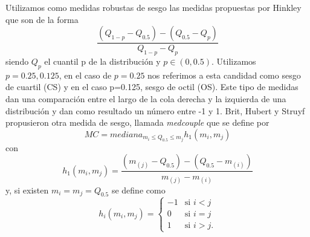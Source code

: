 \documentclass[letterpaper,12pt]{book}
\begin{document}
Utilizamos como medidas robustas de sesgo las medidas propuestas por Hinkley  que son de la forma
  \begin{equation}
    \frac{(Q_{1-p}-Q_{0.5})-(Q_{0.5}-Q_p)}{Q_{1-p}-Q_{p}}
  \end{equation}
siendo $Q_p$ el cuantil p de la distribución y $p\in(0,0.5)$. Utilizamos $p = 0.25, 0.125$, en el caso de $p=0.25$ nos referimos a esta candidad como sesgo de cuartil (CS) y en el caso p=0.125, sesgo de octil (OS). Este tipo de medidas dan una comparación entre el largo de la cola derecha y la izquierda de una distribución y dan como resultado un número entre -1 y 1. Brit, Hubert y Struyf propusieron otra medida de sesgo, llamada \textit{medcouple} que se define por 
\begin{equation}
  MC = mediana_{m_i\leq Q_{0.5} \leq m_j} h_1(m_i,m_j)
\end{equation}
con
\begin{equation}
  h_1(m_i,m_j) = \frac{(m_{(j)}-Q_{0.5})-(Q_{0.5}-m_{(i)})}{m_{(j)}-m_{(i)}}
\end{equation}
y, si existen $m_{i} = m_{j} = Q_{0.5}$ se define como
\begin{equation}
  h_i(m_i,m_j) = \begin{cases} 
      -1 &\mbox{si } i < j \\ 
      0 & \mbox{si } i=j\\
      1 & \mbox{si } i>j.
    \end{cases}
\end{equation}
\end{document}
